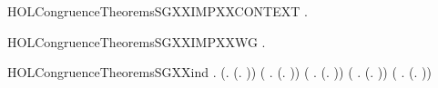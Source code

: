 \begin{SaveVerbatim}{HOLCongruenceTheoremsSGXXIMPXXCONTEXT}
\HOLTokenTurnstile{} \HOLSymConst{\HOLTokenForall{}}.   \HOLSymConst{\HOLTokenImp{}}  
\end{SaveVerbatim}
\newcommand{\HOLCongruenceTheoremsSGXXIMPXXCONTEXT}{\UseVerbatim{HOLCongruenceTheoremsSGXXIMPXXCONTEXT}}
\begin{SaveVerbatim}{HOLCongruenceTheoremsSGXXIMPXXWG}
\HOLTokenTurnstile{} \HOLSymConst{\HOLTokenForall{}}.   \HOLSymConst{\HOLTokenImp{}}  
\end{SaveVerbatim}
\newcommand{\HOLCongruenceTheoremsSGXXIMPXXWG}{\UseVerbatim{HOLCongruenceTheoremsSGXXIMPXXWG}}
\begin{SaveVerbatim}{HOLCongruenceTheoremsSGXXind}
\HOLTokenTurnstile{} \HOLSymConst{\HOLTokenForall{}}.
       (\HOLSymConst{\HOLTokenForall{}}.  (\HOLTokenLambda{}. )) \HOLSymConst{\HOLTokenConj{}}
       (\HOLSymConst{\HOLTokenForall{}} .   \HOLSymConst{\HOLTokenImp{}}  (\HOLTokenLambda{}.   )) \HOLSymConst{\HOLTokenConj{}}
       (\HOLSymConst{\HOLTokenForall{}} .   \HOLSymConst{\HOLTokenImp{}}  (\HOLTokenLambda{}.  )) \HOLSymConst{\HOLTokenConj{}}
       (\HOLSymConst{\HOLTokenForall{}} .   \HOLSymConst{\HOLTokenConj{}}   \HOLSymConst{\HOLTokenImp{}}  (\HOLTokenLambda{}.   \HOLSymConst{\ensuremath{+}}  )) \HOLSymConst{\HOLTokenConj{}}
       (\HOLSymConst{\HOLTokenForall{}} .   \HOLSymConst{\HOLTokenConj{}}   \HOLSymConst{\HOLTokenImp{}}  (\HOLTokenLambda{}.   \HOLSymConst{\ensuremath{\parallel}}  )) \HOLSymConst{\HOLTokenConj{}}

\end{SaveVerbatim}
